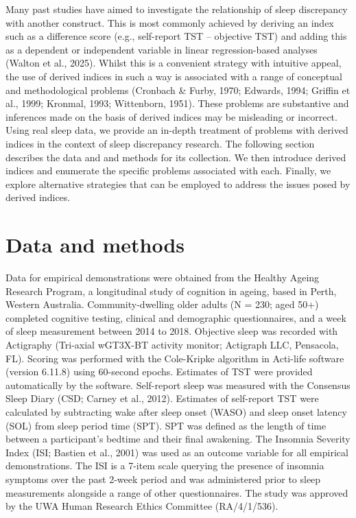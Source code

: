 \documentclass[
]{article}
\begin{document}
Many past studies have aimed to investigate the relationship of sleep discrepancy with another construct. This is most commonly achieved by deriving an index such as a difference score (e.g., self-report TST -- objective TST) and adding this as a dependent or independent variable in linear regression-based analyses (Walton et al., 2025). Whilst this is a convenient strategy with intuitive appeal, the use of derived indices in such a way is associated with a range of conceptual and methodological problems (Cronbach \& Furby, 1970; Edwards, 1994; Griffin et al., 1999; Kronmal, 1993; Wittenborn, 1951). These problems are substantive and inferences made on the basis of derived indices may be misleading or incorrect. Using real sleep data, we provide an in-depth treatment of problems with derived indices in the context of sleep discrepancy research. The following section describes the data and and methods for its collection. We then introduce derived indices and enumerate the specific problems associated with each. Finally, we explore alternative strategies that can be employed to address the issues posed by derived indices.

\section{Data and methods}\label{data-and-methods}

Data for empirical demonstrations were obtained from the Healthy Ageing Research Program, a longitudinal study of cognition in ageing, based in Perth, Western Australia. Community-dwelling older adults (N = 230; aged 50+) completed cognitive testing, clinical and demographic questionnaires, and a week of sleep measurement between 2014 to 2018. Objective sleep was recorded with Actigraphy (Tri-axial wGT3X-BT activity monitor; Actigraph LLC, Pensacola, FL). Scoring was performed with the Cole-Kripke algorithm in Acti-life software (version 6.11.8) using 60-second epochs. Estimates of TST were provided automatically by the software. Self-report sleep was measured with the Consensus Sleep Diary (CSD; Carney et al., 2012). Estimates of self-report TST were calculated by subtracting wake after sleep onset (WASO) and sleep onset latency (SOL) from sleep period time (SPT). SPT was defined as the length of time between a participant's bedtime and their final awakening. The Insomnia Severity Index (ISI; Bastien et al., 2001) was used as an outcome variable for all empirical demonstrations. The ISI is a 7-item scale querying the presence of insomnia symptoms over the past 2-week period and was administered prior to sleep measurements alongside a range of other questionnaires. The study was approved by the UWA Human Research Ethics Committee (RA/4/1/536).
\end{document}
